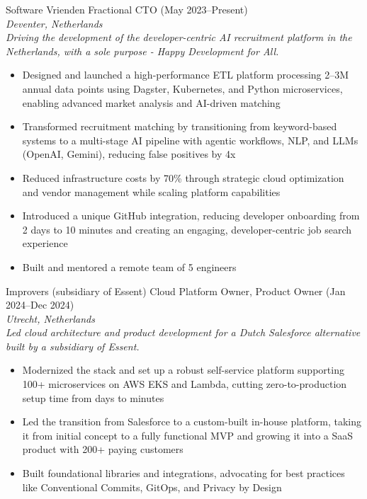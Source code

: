 \documentclass[10pt,a4paper]{article}
\begin{document}
{\headingfont Software Vrienden \hfill Fractional CTO (May 2023--Present)} \\
\textit{Deventer, Netherlands} \\
\textit{Driving the development of the developer-centric AI recruitment platform in the Netherlands, with a sole purpose - Happy Development for All.}
\begin{itemize}[leftmargin=*]
  \item Designed and launched a high-performance ETL platform processing 2--3M annual data points using Dagster, Kubernetes, and Python microservices, enabling advanced market analysis and AI-driven matching
  \item Transformed recruitment matching by transitioning from keyword-based systems to a multi-stage AI pipeline with agentic workflows, NLP, and LLMs (OpenAI, Gemini), reducing false positives by 4x
  \item Reduced infrastructure costs by 70\% through strategic cloud optimization and vendor management while scaling platform capabilities
  \item Introduced a unique GitHub integration, reducing developer onboarding from 2 days to 10 minutes and creating an engaging, developer-centric job search experience
  \item Built and mentored a remote team of 5 engineers
\end{itemize}

{\headingfont Improvers (subsidiary of Essent) \hfill Cloud Platform Owner, Product Owner (Jan 2024--Dec 2024)} \\
\textit{Utrecht, Netherlands} \\
\textit{Led cloud architecture and product development for a Dutch Salesforce alternative built by a subsidiary of Essent.}
\begin{itemize}[leftmargin=*]
  \item Modernized the stack and set up a robust self-service platform supporting 100+ microservices on AWS EKS and Lambda, cutting zero-to-production setup time from days to minutes
  \item Led the transition from Salesforce to a custom-built in-house platform, taking it from initial concept to a fully functional MVP and growing it into a SaaS product with 200+ paying customers
  \item Built foundational libraries and integrations, advocating for best practices like Conventional Commits, GitOps, and Privacy by Design
\end{itemize}
\end{document}
